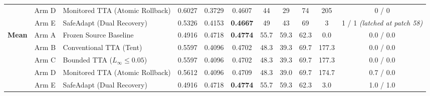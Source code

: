 \documentclass[conference]{IEEEtran}
\begin{document}
\begin{table}[t]
{\begin{tabular}{@{}cclcccccccc@{}}
& Arm D & Monitored TTA (Atomic Rollback)& 0.6027 & 0.3729 & 0.4607          & 44 & 29 & 74 & 205 & 0 / 0 \\
& Arm E & SafeAdapt (Dual Recovery)     & 0.5326 & 0.4153 & \textbf{0.4667} & 49 & 43 & 69 & 3   & 1 / 1 \emph{(latched at patch 58)} \\
\midrule
\multirow{5}{*}{\textbf{Mean}}
& Arm A & Frozen Source Baseline       & 0.4916 & 0.4718 & \textbf{0.4774} & 55.7 & 59.3 & 62.3 & 0.0   & 0.0 / 0.0 \\
& Arm B & Conventional TTA (Tent)       & 0.5597 & 0.4096 & 0.4702          & 48.3 & 39.3 & 69.7 & 177.3 & 0.0 / 0.0 \\
& Arm C & Bounded TTA ($L_\infty \le 0.05$) & 0.5597 & 0.4096 & 0.4702      & 48.3 & 39.3 & 69.7 & 177.3 & 0.0 / 0.0 \\
& Arm D & Monitored TTA (Atomic Rollback)& 0.5612 & 0.4096 & 0.4709          & 48.3 & 39.0 & 69.7 & 174.7 & 0.7 / 0.0 \\
& Arm E & SafeAdapt (Dual Recovery)     & 0.4916 & 0.4718 & \textbf{0.4774} & 55.7 & 59.3 & 62.3 & 3.0   & 1.0 / 1.0 \\
\bottomrule
\end{tabular}%
}
\end{table}

\begin{table}[t]
\centering
\caption{Paired Case-Clustered Bootstrap Contrasts ($B=10{,}000$ Resamples) on Scanner 3.}
\label{tab:h4_bootstrap}
\scriptsize
{}
\end{table}
\end{document}
